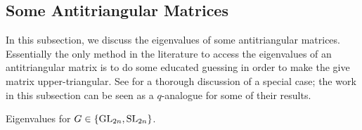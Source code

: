 \subsection{Some Antitriangular Matrices}
In this subsection, we discuss the eigenvalues of some antitriangular matrices. Essentially the only method in the literature to access the eigenvalues of an antitriangular matrix is to do some educated guessing in order to make the give matrix upper-triangular. See \cite{britnell-antitriangular} for a thorough discussion of a special case; the work in this subsection can be seen as a $q$-analogue for some of their results.\todo{}
\begin{theorem} \label{thm:eigens-gl}
    Eigenvalues for $G\in\{\mathrm{GL}_{2n},\mathrm{SL}_{2n}\}$.
\end{theorem}



